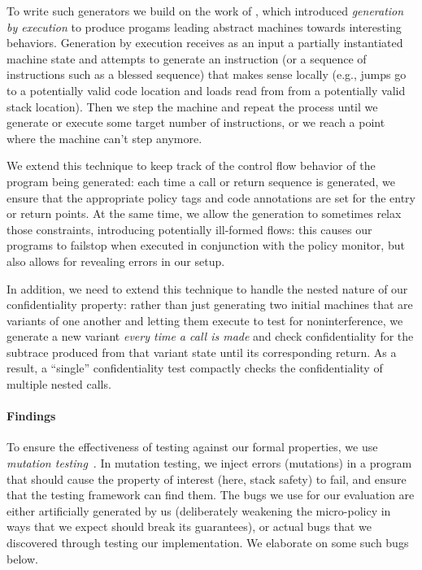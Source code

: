 \documentclass[acmsmall,review,anonymous]{acmart}\settopmatter{printfolios=true,printccs=false,printacmref=false}
\begin{document}
{To write such generators we build on the work of
\citep{TestingNI:ICFP, DBLP:journals/jfp/HritcuLSADHPV16}, which
introduced {\em generation by execution} to produce progams leading
abstract machines towards interesting behaviors. Generation by
execution receives as an input a partially instantiated machine state
and attempts to generate an instruction (or a sequence of instructions
such as a blessed sequence) that makes sense locally (e.g., jumps go
to a potentially valid code location and loads read from from a
potentially valid stack location). Then we step the machine and repeat
the process until we generate or execute some target number of
instructions, or we reach a point where the machine can't step
anymore.

We extend this technique to keep track of the control flow behavior of
the program being generated: each time a call or return sequence is
generated, we ensure that the appropriate policy tags and code
annotations are set for the entry or return points. At the same time,
we allow the generation to sometimes relax those constraints,
introducing potentially ill-formed flows: this causes our programs
to failstop when executed in conjunction with the policy monitor,
but also allows for revealing errors in our setup.

In addition, we need to extend this technique to handle the nested
nature of our confidentiality property: rather than just generating two
initial machines that are variants of one another and letting them
execute to test for noninterference, we generate a new variant
{\em every time a call is made} and check confidentiality for the
subtrace produced from that variant state until its corresponding
return. As a result, a ``single'' confidentiality test compactly
checks the confidentiality of multiple nested calls.

\paragraph*{Findings}

To ensure the effectiveness of testing against our formal properties, we
use {\em mutation testing}~\citep{JiaH11}. In mutation testing, we inject errors
(mutations) in a program that should cause the property of interest (here,
stack safety) to fail, and ensure that the testing framework can find
them. The bugs we use for our evaluation are either artificially generated
by us (deliberately weakening the micro-policy in ways that we expect
should break its guarantees), or actual bugs that we discovered through
testing our implementation. We elaborate on some such bugs below.

}
\end{document}

